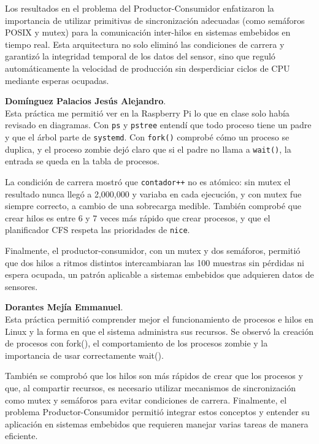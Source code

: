 \documentclass[conference]{IEEEtran}
\begin{document}
Los resultados en el problema del Productor-Consumidor enfatizaron la importancia de utilizar primitivas de sincronización adecuadas (como semáforos POSIX y mutex) para la comunicación inter-hilos en sistemas embebidos en tiempo real. Esta arquitectura no solo eliminó las condiciones de carrera y garantizó la integridad temporal de los datos del sensor, sino que reguló automáticamente la velocidad de producción sin desperdiciar ciclos de CPU mediante esperas ocupadas.

\textbf{Domínguez Palacios Jesús Alejandro}. \\
Esta práctica me permitió ver en la Raspberry Pi lo que en clase solo había revisado en diagramas. Con \texttt{ps} y \texttt{pstree} entendí que todo proceso tiene un padre y que el árbol parte de \texttt{systemd}. Con \texttt{fork()} comprobé cómo un proceso se duplica, y el proceso zombie dejó claro que si el padre no llama a \texttt{wait()}, la entrada se queda en la tabla de procesos.

La condición de carrera mostró que \texttt{contador++} no es atómico: sin mutex el resultado nunca llegó a 2,000,000 y variaba en cada ejecución, y con mutex fue siempre correcto, a cambio de una sobrecarga medible. También comprobé que crear hilos es entre 6 y 7 veces más rápido que crear procesos, y que el planificador CFS respeta las prioridades de \texttt{nice}.

Finalmente, el productor-consumidor, con un mutex y dos semáforos, permitió que dos hilos a ritmos distintos intercambiaran las 100 muestras sin pérdidas ni espera ocupada, un patrón aplicable a sistemas embebidos que adquieren datos de sensores.

\textbf{Dorantes Mejía Emmanuel}. \\
Esta práctica permitió comprender mejor el funcionamiento de procesos e hilos en Linux y la forma en que el sistema administra sus recursos. Se observó la creación de procesos con fork(), el comportamiento de los procesos zombie y la importancia de usar correctamente wait().

También se comprobó que los hilos son más rápidos de crear que los procesos y que, al compartir recursos, es necesario utilizar mecanismos de sincronización como mutex y semáforos para evitar condiciones de carrera. Finalmente, el problema Productor-Consumidor permitió integrar estos conceptos y entender su aplicación en sistemas embebidos que requieren manejar varias tareas de manera eficiente.
\end{document}
